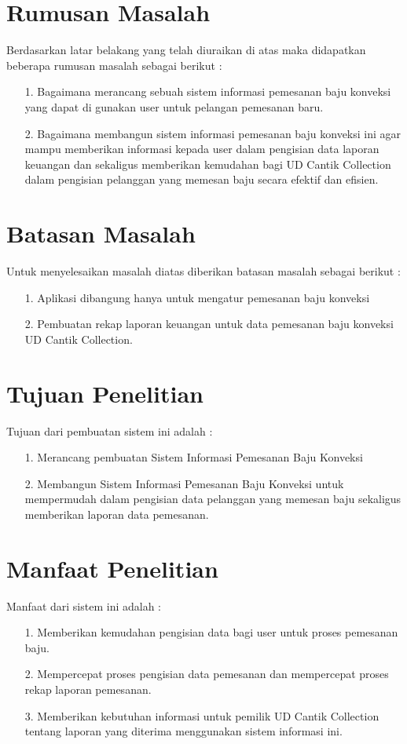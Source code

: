 \documentclass{jtetiproposalskripsi}
\begin{document}
\section{Rumusan Masalah}
Berdasarkan latar belakang yang telah diuraikan di atas maka didapatkan beberapa rumusan masalah sebagai berikut :
\begin{itemize}
\item[1.]	Bagaimana merancang sebuah sistem informasi pemesanan baju konveksi  yang dapat di gunakan user untuk pelangan pemesanan baru.
\item[2.]	Bagaimana membangun sistem informasi pemesanan baju konveksi ini agar mampu memberikan informasi kepada user dalam pengisian data laporan keuangan dan sekaligus memberikan kemudahan bagi UD Cantik Collection dalam pengisian pelanggan yang memesan baju secara efektif dan efisien. 


\end{itemize}

\section{Batasan Masalah}
Untuk menyelesaikan masalah diatas diberikan batasan masalah sebagai berikut :
\begin{itemize}
\item[1.]Aplikasi dibangung hanya untuk mengatur pemesanan baju konveksi
\item[2.]Pembuatan rekap laporan keuangan untuk data pemesanan baju konveksi UD Cantik Collection.

\end{itemize}


\section{Tujuan Penelitian}
Tujuan dari pembuatan sistem ini adalah :
\begin{itemize}
\item[1.]Merancang pembuatan Sistem Informasi Pemesanan Baju Konveksi
\item[2.]Membangun Sistem Informasi Pemesanan Baju Konveksi untuk mempermudah dalam pengisian data pelanggan yang memesan baju sekaligus memberikan laporan data pemesanan.

\end{itemize}


\section{Manfaat Penelitian}
Manfaat dari sistem ini adalah :
\begin{itemize}
\item[1.]Memberikan kemudahan pengisian data bagi user untuk proses pemesanan baju.
\item[2.]Mempercepat proses pengisian data pemesanan dan mempercepat proses rekap laporan pemesanan.
\item[3.]Memberikan kebutuhan  informasi untuk pemilik UD Cantik Collection tentang laporan yang diterima menggunakan sistem informasi ini.
\end{itemize}
\end{document}
